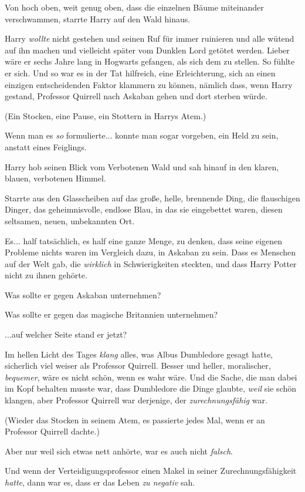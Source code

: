 {Von hoch oben, weit genug oben, dass die einzelnen Bäume miteinander verschwammen, starrte Harry auf den Wald hinaus.

Harry \emph{wollte} nicht gestehen und seinen Ruf für immer ruinieren und alle wütend auf ihn machen und vielleicht später vom Dunklen Lord getötet werden. Lieber wäre er sechs Jahre lang in Hogwarts gefangen, als sich dem zu stellen. So fühlte er sich. Und so war es in der Tat hilfreich, eine Erleichterung, sich an einen einzigen entscheidenden Faktor klammern zu können, nämlich dass, wenn Harry gestand, Professor Quirrell nach Askaban gehen und dort sterben würde.

(Ein Stocken, eine Pause, ein Stottern in Harrys Atem.)

Wenn man es \emph{so} formulierte... konnte man sogar vorgeben, ein Held zu sein, anstatt eines Feiglings.

Harry hob seinen Blick vom Verbotenen Wald und sah hinauf in den klaren, blauen, verbotenen Himmel.

Starrte aus den Glasscheiben auf das große, helle, brennende Ding, die flauschigen Dinger, das geheimnisvolle, endlose Blau, in das sie eingebettet waren, diesen seltsamen, neuen, unbekannten Ort.

Es... half tatsächlich, es half eine ganze Menge, zu denken, dass seine eigenen Probleme nichts waren im Vergleich dazu, in Askaban zu sein. Dass es Menschen auf der Welt gab, die \emph{wirklich} in Schwierigkeiten steckten, und dass Harry Potter nicht zu ihnen gehörte.

Was sollte er gegen Askaban unternehmen?

Was sollte er gegen das magische Britannien unternehmen?

...auf welcher Seite stand er jetzt?

Im hellen Licht des Tages \emph{klang} alles, was Albus Dumbledore gesagt hatte, sicherlich viel weiser als Professor Quirrell. Besser und heller, moralischer, \emph{bequemer}, wäre es nicht schön, wenn es wahr wäre. Und die Sache, die man dabei im Kopf behalten musste war, dass Dumbledore die Dinge glaubte, \emph{weil} sie schön klangen, aber Professor Quirrell war derjenige, der \emph{zurechnungsfähig} war.

(Wieder das Stocken in seinem Atem, es passierte jedes Mal, wenn er an Professor Quirrell dachte.)

Aber nur weil sich etwas nett anhörte, war es auch nicht \emph{falsch}.

Und wenn der Verteidigungsprofessor einen Makel in seiner Zurechnungsfähigkeit \emph{hatte}, dann war es, dass er das Leben \emph{zu negativ} sah.

}
